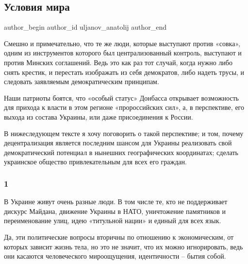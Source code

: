  
 
 
 
 
 
\subsection{Условия мира}
\label{sec:30_01_2022.stz.ludi.uljanov_anatolij.1.uslovia_mira}
 
\ifcmt
 author_begin
   author_id uljanov_anatolij
 author_end
\fi

Смешно и примечательно, что те же люди, которые выступают против «совка», одним
из инструментов которого был централизованный контроль, выступают и против
Минских соглашений. Ведь это как раз тот случай, когда нужно либо снять
крестик, и перестать изображать из себя демократов, либо надеть трусы, и
следовать заявляемым демократическим принципам.

Наши патриоты боятся, что «особый статус» Донбасса открывает возможность для
прихода к власти в этом регионе «пророссийских сил», а, в перспективе, его
выхода из состава Украины, или даже присоединения к России.

В нижеследующем тексте я хочу поговорить о такой перспективе; и том, почему
децентрализация является последним шансом для Украины реализовать свой
демократический потенциал в нынешних географических координатах; сделать
украинское общество привлекательным для всех его граждан.

\subsubsection{1}

В Украине живут очень разные люди. В том числе те, кто не поддерживает дискурс
Майдана, движение Украины в НАТО, уничтожение памятников и переименование улиц,
идею «титульной нации» и единый для всех язык. 

Да, эти политические вопросы вторичны по отношению к экономическим, от которых
зависит жизнь тела, но это не значит, что их можно игнорировать, ведь они
касаются человеческого мироощущения, идентичности – бытия собой.

